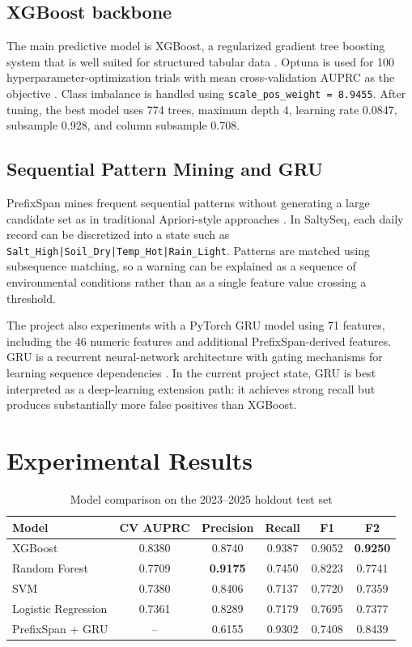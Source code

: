 \documentclass[a4paper, 11pt]{article}
\begin{document}
\subsection{XGBoost backbone}

The main predictive model is XGBoost, a regularized gradient tree boosting system that is well suited for structured tabular data \cite{chen2016xgboost}. Optuna is used for 100 hyperparameter-optimization trials with mean cross-validation AUPRC as the objective \cite{akiba2019optuna}. Class imbalance is handled using \texttt{scale\_pos\_weight = 8.9455}. After tuning, the best model uses 774 trees, maximum depth 4, learning rate 0.0847, subsample 0.928, and column subsample 0.708.

\subsection{Sequential Pattern Mining and GRU}

PrefixSpan mines frequent sequential patterns without generating a large candidate set as in traditional Apriori-style approaches \cite{pei2001prefixspan}. In SaltySeq, each daily record can be discretized into a state such as \texttt{Salt\_High|Soil\_Dry|Temp\_Hot|Rain\_Light}. Patterns are matched using subsequence matching, so a warning can be explained as a sequence of environmental conditions rather than as a single feature value crossing a threshold.

The project also experiments with a PyTorch GRU model using 71 features, including the 46 numeric features and additional PrefixSpan-derived features. GRU is a recurrent neural-network architecture with gating mechanisms for learning sequence dependencies \cite{cho2014gru}. In the current project state, GRU is best interpreted as a deep-learning extension path: it achieves strong recall but produces substantially more false positives than XGBoost.

\section{Experimental Results}

\begin{table}[!htbp]
\centering
\caption{Model comparison on the 2023--2025 holdout test set}
\label{tab:model-results}
\small
\begin{tabular}{lccccc}
\toprule
\textbf{Model} & \textbf{CV AUPRC} & \textbf{Precision} & \textbf{Recall} & \textbf{F1} & \textbf{F2} \\
\midrule
XGBoost & 0.8380 & 0.8740 & 0.9387 & 0.9052 & \textbf{0.9250} \\
Random Forest & 0.7709 & \textbf{0.9175} & 0.7450 & 0.8223 & 0.7741 \\
SVM & 0.7380 & 0.8406 & 0.7137 & 0.7720 & 0.7359 \\
Logistic Regression & 0.7361 & 0.8289 & 0.7179 & 0.7695 & 0.7377 \\
PrefixSpan + GRU & -- & 0.6155 & 0.9302 & 0.7408 & 0.8439 \\
\bottomrule
\end{tabular}
\end{table}
\end{document}
